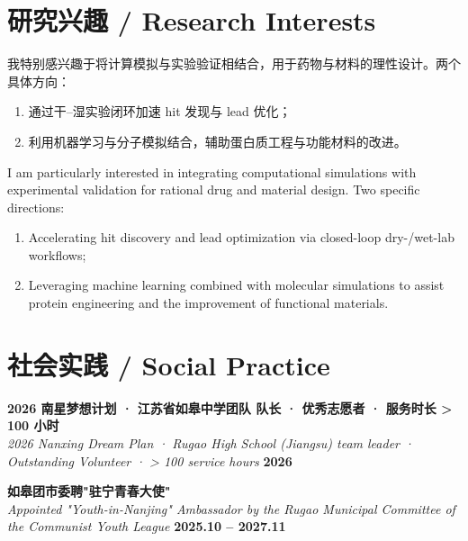 \documentclass[11pt,a4paper]{article}
\newcommand{\cvdateinline}[1]{{\color{njublue}\small\bfseries #1}}
\begin{document}
\section*{研究兴趣 \quad / \quad Research Interests}

我特别感兴趣于将计算模拟与实验验证相结合，用于药物与材料的理性设计。两个具体方向：
\itshape\small
\begin{enumerate}[leftmargin=18pt,nosep]
\item 通过干--湿实验闭环加速 hit 发现与 lead 优化；
\item 利用机器学习与分子模拟结合，辅助蛋白质工程与功能材料的改进。
\end{enumerate}
\upshape\normalfont
\medskip
I am particularly interested in integrating computational simulations with experimental validation for rational drug and material design. Two specific directions:
\begin{enumerate}[leftmargin=18pt,nosep]
\item Accelerating hit discovery and lead optimization via closed-loop dry-/wet-lab workflows;
\item Leveraging machine learning combined with molecular simulations to assist protein engineering and the improvement of functional materials.
\end{enumerate}

\section*{社会实践 \quad / \quad Social Practice}

\begin{simpleitem}
\textbf{2026 南星梦想计划 · 江苏省如皋中学团队 队长 · 优秀志愿者 · 服务时长 > 100 小时}\\
{\itshape\small 2026 Nanxing Dream Plan · Rugao High School (Jiangsu) team leader · Outstanding Volunteer · > 100 service hours}
\hfill \cvdateinline{2026}
\end{simpleitem}

\begin{simpleitem}
\textbf{如皋团市委聘"驻宁青春大使"}\\
{\itshape\small Appointed "Youth-in-Nanjing" Ambassador by the Rugao Municipal Committee of the Communist Youth League}
\hfill \cvdateinline{2025.10 -- 2027.11}
\end{simpleitem}
\end{document}
